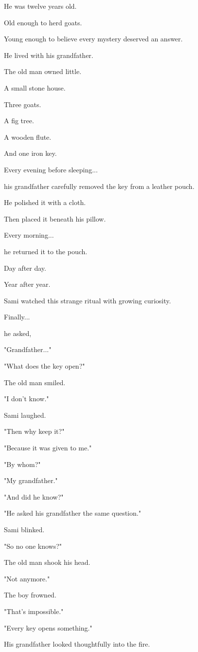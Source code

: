 \documentclass[12pt,openany]{book}
\begin{document}
He was twelve years old.

Old enough to herd goats.

Young enough to believe every mystery deserved an answer.

He lived with his grandfather.

The old man owned little.

A small stone house.

Three goats.

A fig tree.

A wooden flute.

And one iron key.

Every evening before sleeping...

his grandfather carefully removed the key from a leather pouch.

He polished it with a cloth.

Then placed it beneath his pillow.

Every morning...

he returned it to the pouch.

Day after day.

Year after year.

Sami watched this strange ritual with growing curiosity.

Finally...

he asked,

"Grandfather..."

"What does the key open?"

The old man smiled.

"I don't know."

Sami laughed.

"Then why keep it?"

"Because it was given to me."

"By whom?"

"My grandfather."

"And did he know?"

"He asked his grandfather the same question."

Sami blinked.

"So no one knows?"

The old man shook his head.

"Not anymore."

The boy frowned.

"That's impossible."

"Every key opens something."

His grandfather looked thoughtfully into the fire.
\end{document}
